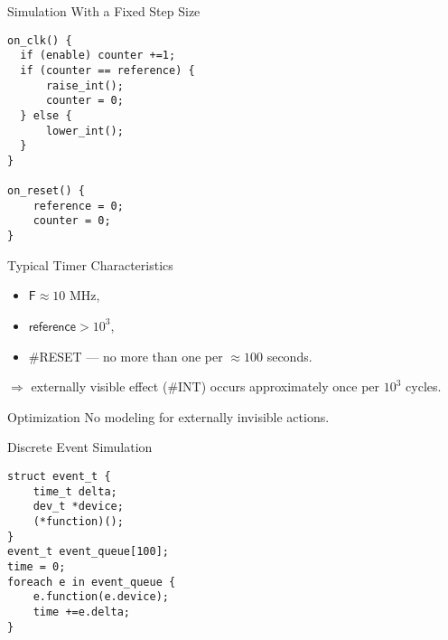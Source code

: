 \begin{frame}[fragile]{Simulation With a Fixed Step Size}
\begin{lstlisting}
on_clk() {
  if (enable) counter +=1;
  if (counter == reference) {
      raise_int();
      counter = 0;
  } else {
      lower_int();
  }
}

on_reset() {
    reference = 0;
    counter = 0;
}
\end{lstlisting}
\end{frame}

\begin{frame}{Typical Timer Characteristics}
\begin{itemize}
    \item $\mathsf{F} \approx 10$ MHz,
    \item $\mathsf{reference} > 10^3$,
    \item \#RESET --- no more than one per $\approx 100$ seconds.
\end{itemize}
\vfill
$\Rightarrow$ externally visible effect (\#INT) occurs approximately once per
$10^3$ cycles.
\end{frame}

\begin{frame}{Optimization}
No modeling for externally invisible actions.
\vfill
\centering
{}
\end{frame}

\begin{frame}[fragile]{Discrete Event Simulation}
\begin{lstlisting}
struct event_t {
    time_t delta;
    dev_t *device;
    (*function)();
}
event_t event_queue[100];
time = 0;
foreach e in event_queue {
    e.function(e.device);
    time +=e.delta;
}
\end{lstlisting}
\end{frame}

